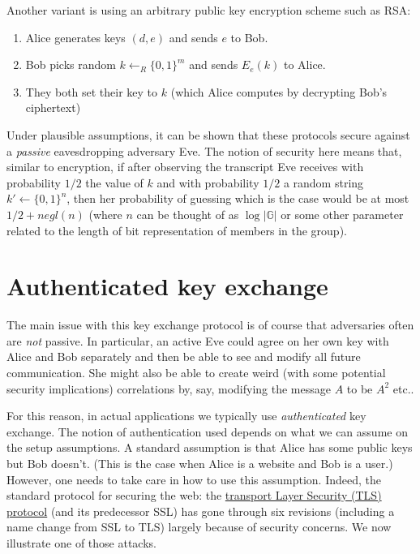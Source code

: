 Another variant is using an arbitrary public key encryption scheme such
as RSA:

\begin{enumerate}
\def\labelenumi{\arabic{enumi}.}
\item
  Alice generates keys \((d,e)\) and sends \(e\) to Bob.
\item
  Bob picks random \(k \leftarrow_R\{0,1\}^m\) and sends \(E_e(k)\) to
  Alice.
\item
  They both set their key to \(k\) (which Alice computes by decrypting
  Bob's ciphertext)
\end{enumerate}

Under plausible assumptions, it can be shown that these protocols secure
against a \emph{passive} eavesdropping adversary Eve. The notion of
security here means that, similar to encryption, if after observing the
transcript Eve receives with probability \(1/2\) the value of \(k\) and
with probability \(1/2\) a random string \(k'\gets\{0,1\}^n\), then her
probability of guessing which is the case would be at most
\(1/2+negl(n)\) (where \(n\) can be thought of as \(\log |\mathbb{G}|\)
or some other parameter related to the length of bit representation of
members in the group).

\section{Authenticated key exchange}\label{14-Authenticated-key-exch}

The main issue with this key exchange protocol is of course that
adversaries often are \emph{not} passive. In particular, an active Eve
could agree on her own key with Alice and Bob separately and then be
able to see and modify all future communication. She might also be able
to create weird (with some potential security implications) correlations
by, say, modifying the message \(A\) to be \(A^2\) etc..

For this reason, in actual applications we typically use
\emph{authenticated} key exchange. The notion of authentication used
depends on what we can assume on the setup assumptions. A standard
assumption is that Alice has some public keys but Bob doesn't. (This is
the case when Alice is a website and Bob is a user.) However, one needs
to take care in how to use this assumption. Indeed, the standard
protocol for securing the web: the
\href{https://goo.gl/md9Bsa}{transport Layer Security (TLS) protocol}
(and its predecessor SSL) has gone through six revisions (including a
name change from SSL to TLS) largely because of security concerns. We
now illustrate one of those attacks.

